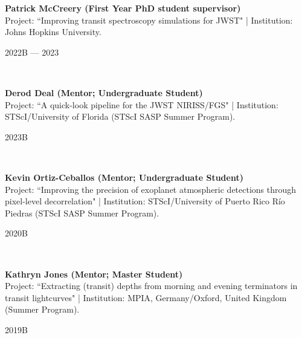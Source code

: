 \documentclass[12pt, a4paper]{article} %
\begin{document}
\begin{minipage}[t]{0.7\textwidth}
\begin{flushleft}%
  \setlength{\leftskip}{0.2cm}%
\textbf{Patrick McCreery (First Year PhD student supervisor)}\\
Project: ``Improving transit spectroscopy simulations for JWST" | Institution: Johns Hopkins University.
\end{flushleft}
\end{minipage}
\begin{minipage}[t]{0.3\textwidth}
\hfill 2022B --- 2023
\end{minipage}\\

\begin{minipage}[t]{0.7\textwidth}
\begin{flushleft}%
  \setlength{\leftskip}{0.2cm}%
\textbf{Derod Deal (Mentor; Undergraduate Student)}\\
Project: ``A quick-look pipeline for the JWST NIRISS/FGS" | Institution: STScI/University of Florida (STScI SASP Summer Program).
\end{flushleft}
\end{minipage}
\begin{minipage}[t]{0.3\textwidth}
\hfill 2023B
\end{minipage}\\

\begin{minipage}[t]{0.7\textwidth}
\begin{flushleft}%
  \setlength{\leftskip}{0.2cm}%
\textbf{Kevin Ortiz-Ceballos (Mentor; Undergraduate Student)}\\
Project: ``Improving the precision of exoplanet atmospheric detections through pixel-level decorrelation" | Institution: STScI/University of Puerto Rico Río Piedras (STScI SASP Summer Program).
\end{flushleft}
\end{minipage}
\begin{minipage}[t]{0.3\textwidth}
\hfill 2020B
\end{minipage}\\

\begin{minipage}[t]{0.7\textwidth}
\begin{flushleft}%
  \setlength{\leftskip}{0.2cm}%
\textbf{Kathryn Jones (Mentor; Master Student)}\\
Project: ``Extracting (transit) depths from morning and evening terminators in transit lightcurves" | Institution: MPIA, Germany/Oxford, United Kingdom (Summer Program).
\end{flushleft}
\end{minipage}
\begin{minipage}[t]{0.3\textwidth}
\hfill 2019B
\end{minipage}\\
\end{document}
